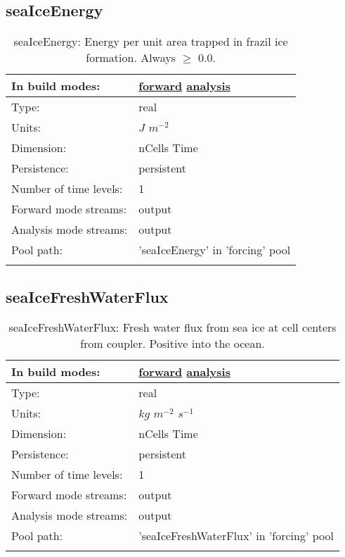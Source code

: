 \subsection[seaIceEnergy]{seaIceEnergy}
\label{subsec:var_sec_forcing_seaIceEnergy}
\begin{center}
\begin{longtable}{| p{2.0in} | p{4.0in} |}
        \hline 
        In build modes: & \hyperref[subsec:forward_var_tab_forcing]{forward} \hyperref[subsec:analysis_var_tab_forcing]{analysis} \\
        \hline 
        Type: & real \\
        \hline 
        Units: & $J$ $m^{-2}$ \\
        \hline 
        Dimension: & nCells Time \\
        \hline 
        Persistence: & persistent \\
        \hline 
        Number of time levels: & 1 \\
        \hline 
		 Forward mode streams: &  output \\
        \hline 
		 Analysis mode streams: &  output \\
        \hline 
            Pool path: & 'seaIceEnergy' in 'forcing' pool
 \\
		 \hline 
    \caption{seaIceEnergy:  Energy per unit area trapped in frazil ice formation. Always  $\ge$  0.0.}
\end{longtable}
\end{center}
\subsection[seaIceFreshWaterFlux]{seaIceFreshWaterFlux}
\label{subsec:var_sec_forcing_seaIceFreshWaterFlux}
\begin{center}
\begin{longtable}{| p{2.0in} | p{4.0in} |}
        \hline 
        In build modes: & \hyperref[subsec:forward_var_tab_forcing]{forward} \hyperref[subsec:analysis_var_tab_forcing]{analysis} \\
        \hline 
        Type: & real \\
        \hline 
        Units: & $kg$ $m^{-2}$ $s^{-1}$ \\
        \hline 
        Dimension: & nCells Time \\
        \hline 
        Persistence: & persistent \\
        \hline 
        Number of time levels: & 1 \\
        \hline 
		 Forward mode streams: &  output \\
        \hline 
		 Analysis mode streams: &  output \\
        \hline 
            Pool path: & 'seaIceFreshWaterFlux' in 'forcing' pool
 \\
		 \hline 
    \caption{seaIceFreshWaterFlux: Fresh water flux from sea ice at cell centers from coupler. Positive into the ocean.}
\end{longtable}
\end{center}
